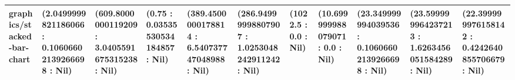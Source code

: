 \begin{table}
\begin{tabular}{lllllllllll}
graphics/stacked-bar-chart & (2.0499999821186066 : 0.10606602139266698 : Nil) & (609.8000000119209 : 3.0405591675315238 : Nil) & (0.75 : 0.03535530534184857 : Nil) & (389.4500000178814 : 6.540737747048988 : Nil) & (286.94999998807907 : 1.0253048242911242 : Nil) & (1022.5 : 0.0 : Nil) & (10.699999988079071 : 0.0 : Nil) & (23.349999994039536 : 0.10606602139266698 : Nil) & (23.599999964237213 : 1.6263456051584289 : Nil) & (22.399999976158142 : 0.4242640855706679 : Nil) \\
\bottomrule
\end{tabular}
\end{table}
